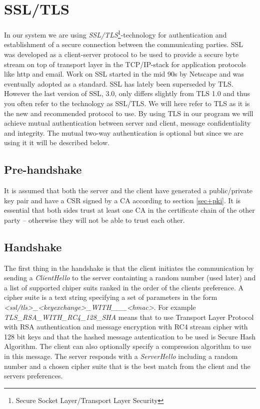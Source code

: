 \documentclass[10pt, a4paper]{article}
\begin{document}
\section{SSL/TLS}
\label{sec+tls}
In our system we are using \emph{SSL/TLS}\footnote{Secure Socket Layer/Transport Layer Security}-technology for authentication and establishment of a secure connection between the communicating parties. SSL was developed as a client-server protocol to be used to provide a secure byte stream on top of transport layer in the TCP/IP-stack for application protocols like http and email. Work on SSL started in the mid 90s by Netscape and was eventually adopted as a standard. SSL has lately been superseded by TLS. However the last version of SSL, 3.0, only differs slightly from TLS 1.0 and thus you often refer to the technology as SSL/TLS. We will here refer to TLS as it is the new  and recommended protocol to use. By using TLS in our program we will achieve mutual authentication between server and client, message confidentiality and integrity. The mutual two-way authentication is optional but since we are using it it will be described below.


\subsection{Pre-handshake}
It is assumed that both the server and the client have generated a public/private key pair and have a CSR signed by a CA according to section \ref{sec+pki}. It is essential that both sides trust at least one CA in the certificate chain of the other party -- otherwise they will not be able to trust each other.

\subsection{Handshake}
The first thing in the handshake is that the client initiates the communication by sending a \emph{ClientHello} to the server containting a random number (used later) and a list of supported chiper suits ranked in the order of the clients preference. A cipher suite is a text string specifying a set of parameters in the form \emph{<ssl/tls>\_<keyexchange>\_WITH\_<encyption-type>\_<enc-key-size>\_<hmac>}. For example \emph{TLS\_RSA\_WITH\_RC4\_128\_SHA} means that to use Transport Layer Protocol with RSA authentication and message encryption with RC4 stream cipher with 128 bit keys and that the hashed message autentication to be used is Secure Hash Algorithm. The client can also optionally specify a compression algorithm to use in this message. The server responds with a \emph{ServerHello} including a random number and a chosen cipher suite that is the best match from the client and the servers preferences.
\end{document}
